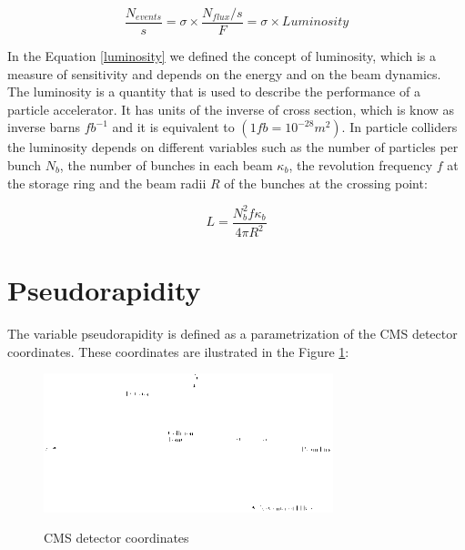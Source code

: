  \begin{equation}
 \label{luminosity}
  \frac{N_{events}}{s} = \sigma \times \frac{N_{flux}/s}{F} = \sigma \times Luminosity
 \end{equation}

 In the Equation \ref{luminosity} we defined the concept of luminosity, which is a measure of sensitivity and depends on the energy and on the beam dynamics.  The luminosity is a quantity that is used to 
 describe the performance of a particle accelerator. It has units of the inverse of cross section, which is know as inverse barns $fb^{-1}$ and it is equivalent to $(1 fb = 10^{-28} m^2)$. 
 In particle colliders the 
 luminosity depends on different variables such as the number of particles per bunch $N_b$, the number of bunches in each beam $\kappa_b$, the revolution frequency $f$ at the storage ring and the beam radii 
 $R$ of the bunches at the crossing point:
 
 \begin{equation}
  L = \frac{N_b^2 f \kappa_b}{4\pi R^2} 
 \end{equation}

 \section{Pseudorapidity}
 
 The variable pseudorapidity is defined as a parametrization of the CMS detector coordinates. These coordinates are ilustrated in the Figure \ref{CMSCoordinates}:
 
 \begin{figure}[h]
 \centering
 \caption{CMS detector coordinates}
 \includegraphics[width=0.75\textwidth]{./Capitulos/VariableDefinitions/CMS_coordinates}  
 \label{CMSCoordinates}
 \end{figure}


